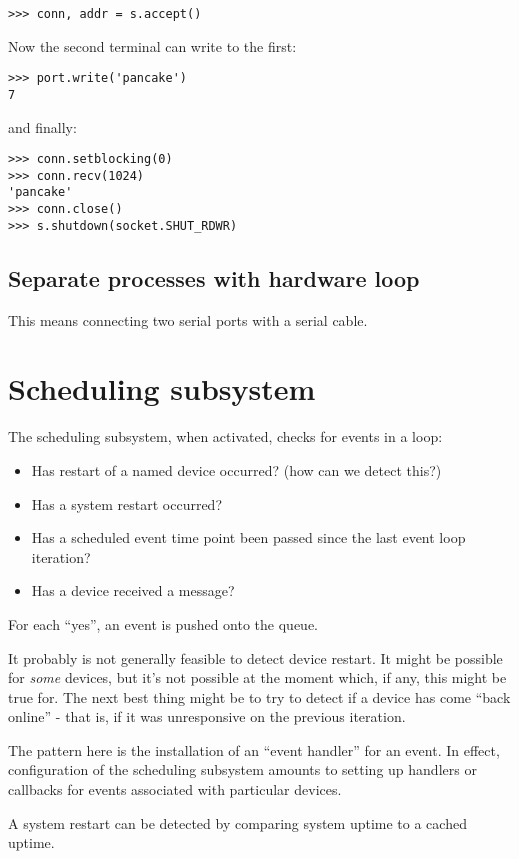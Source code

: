 \documentclass[pdftex,oneside,12pt,a4paper]{book}
\begin{document}
\begin{verbatim}
>>> conn, addr = s.accept()
\end{verbatim}
Now the second terminal can write to the first:
\begin{verbatim}
>>> port.write('pancake')
7
\end{verbatim}
and finally:
\begin{verbatim}
>>> conn.setblocking(0)
>>> conn.recv(1024)
'pancake'
>>> conn.close()
>>> s.shutdown(socket.SHUT_RDWR)
\end{verbatim}

\section{Separate processes with hardware loop}
This means connecting two serial ports with a serial cable.


\chapter{Scheduling subsystem}
The scheduling subsystem, when activated, checks for events in a loop:
\begin{itemize}
\item Has restart of a named device occurred? (how can we detect this?)
\item Has a system restart occurred?
\item Has a scheduled event time point been passed since the last event loop iteration?
\item Has a device received a message? 
\end{itemize}
For each ``yes'', an event is pushed onto the queue.

It probably is not generally feasible to detect device restart.  It might be possible for \emph{some} devices, but it's not possible at the moment which, if any, this might be true for.  The next best thing might be to try to detect if a device has come ``back online'' - that is, if it was unresponsive on the previous iteration.

The pattern here is the installation of an ``event handler'' for an event.  In effect, configuration of the scheduling subsystem amounts to setting up handlers or callbacks for events associated with particular devices.

A system restart can be detected by comparing system uptime to a cached uptime.
\end{document}
